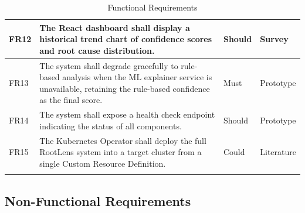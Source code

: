 \begin{xltabular}{\textwidth}{|p{1.5cm}|X|p{2cm}|p{2cm}|}
FR12 & The React dashboard shall display a historical trend chart of confidence scores and root cause distribution. & Should & Survey \\ \hline
FR13 & The system shall degrade gracefully to rule-based analysis when the ML explainer service is unavailable, retaining the rule-based confidence as the final score. & Must & Prototype \\ \hline
FR14 & The system shall expose a health check endpoint indicating the status of all components. & Should & Prototype \\ \hline
FR15 & The Kubernetes Operator shall deploy the full RootLens system into a target cluster from a single Custom Resource Definition. & Could & Literature \\ \hline

\caption{Functional Requirements}
\label{tab:functional_requirements}
\end{xltabular}

\subsection{Non-Functional Requirements}

\renewcommand{\arraystretch}{1.3}

